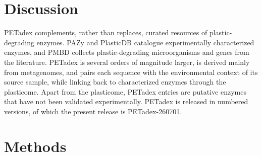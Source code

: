 \documentclass[pdflatex,sn-nature,iicol]{sn-jnl}%
\begin{document}
\section{Discussion}


PETadex complements, rather than replaces, curated resources of plastic-degrading enzymes. PAZy \citep{buchholz2022pazy} and PlasticDB \citep{gambarini2022plasticdb} catalogue experimentally characterized enzymes, and PMBD \citep{gan2019pmbd} collects plastic-degrading microorganisms and genes from the literature. PETadex is several orders of magnitude larger, is derived mainly from metagenomes, and pairs each sequence with the environmental context of its source sample, while linking back to characterized enzymes through the plasticome. Apart from the plasticome, PETadex entries are putative enzymes that have not been validated experimentally. PETadex is released in numbered versions, of which the present release is PETadex-260701.

\section{Methods}
\end{document}
